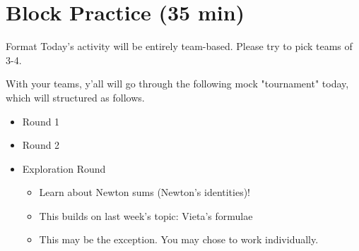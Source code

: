 \documentclass[aspectratio=169,xcolor=dvipsnames]{beamer}
\begin{document}
% 
% 

\section{Block Practice (35 min)}

\begin{frame}[t]{Format}
    Today's activity will be entirely team-based\textsuperscript{\textdagger}. Please try to pick teams of 3-4. 
    
    \vspace{1em}
    
    With your teams, y'all will go through the following mock "tournament" today, which will structured as follows.
    \vspace{1.5em}
    \begin{itemize}
        \setlength\itemsep{1em}
        \item Round 1
        \item Round 2
        \item Exploration Round
        \begin{itemize}
            \item Learn about Newton sums (Newton's identities)! 
            \item This builds on last week's topic: Vieta's formulae
            \item \textsuperscript{\textdagger}This may be the exception. You may chose to work individually.
        \end{itemize}
    \end{itemize}
\end{frame}
\end{document}
